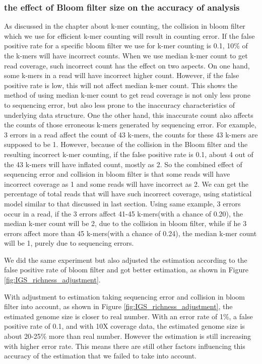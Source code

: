 \documentclass{article}
\begin{document}
\subsubsection{the effect of Bloom filter size on the accuracy of analysis}
As discussed in the chapter about k-mer counting, the collision in bloom filter
which we use for efficient k-mer counting will result in counting error. If the
false positive rate for a specific bloom filter we use for k-mer counting is
0.1, 10\% of the k-mers will have incorrect counts. When we use median k-mer
count to get read coverage, such incorrect count has the effect on two aspects.
On one hand, some k-mers in a read will have incorrect higher count. However, if the
 false
positive rate is low, this will not affect median k-mer count. This shows the
method of using median k-mer count to get read coverage is not only less prone
to sequencing error, but also less prone to the inaccuracy characteristics of
underlying data structure. One the other hand, this inaccurate count also
affects the counts of those erroneous k-mers generated by sequencing error. For
example, 3 errors in a read affect the count of 43 k-mers, the counts for these
43 k-mers are supposed to be 1. However, because of the collision in the Bloom filter
and the resulting incorrect k-mer counting, if the false positive rate is 0.1,
about 4 out of the 43 k-mers will have inflated count, mostly as 2. So the
combined effect of sequencing error and collision in bloom filter is that some
reads will have incorrect coverage as 1 and some reads will have incorrect as
2. We can get the percentage of total reads that will have such incorrect
coverage, using statistical model similar to that discussed in last section.
Using same example, 3 errors occur in a read, if the 3 errors affect 41-45
k-mers(with a chance of 0.20), the median k-mer count will be 2, due to the 
collision in bloom filter, while if he 3 errors affect more than 45 k-mers(with 
a chance of 0.24), the median k-mer count will be 1, purely due to sequencing 
errors. 

We did the same experiment but also adjusted the estimation according to the 
false positive rate of bloom filter and got better estimation, as shown in
Figure \ref{fig:IGS_richness_adjustment}.

With adjustment to estimation taking sequencing error and collision in bloom
filter into account, as shown in Figure \ref{fig:IGS_richness_adjustment}, the 
estimated genome size is closer to real number. With an error rate of 1\%,
a false positive rate of 0.1, and with 10X coverage data, the estimated genome size
is about 20-25\% more than real number. However the estimation is still 
increasing with higher
error rate. This means there are still other factors influencing this
accuracy of the estimation that we failed to take into account.
\end{document}
